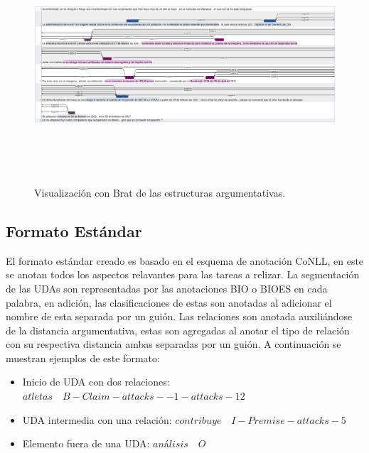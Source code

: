 \begin{figure}[h!]
	\begin{center}
		\includegraphics[scale=.4, width=450pt, height=250pt]{Graphics/persuasive_2019-03-22|inconformidad-con-la-chequera.png}
		\caption{Visualización con Brat de las estructuras argumentativas.}\label{fig:brat_persuasive_granma_letters}
	\end{center}
\end{figure}

\subsection{Formato Estándar}

El formato estándar creado es basado en el esquema de anotación CoNLL, en este se anotan todos los aspectos 
relavantes para las tareas a relizar. La segmentación de las UDAs son representadas por las anotaciones 
BIO o BIOES en cada palabra, en adición, las clasificaciones de estas son anotadas al adicionar el nombre 
de esta separada por un guión. Las relaciones son anotada auxiliándose de la distancia argumentativa, estas 
son agregadas al anotar el tipo de relación con su respectiva distancia ambas separadas por un guión. A 
continuación se muestran ejemplos de este formato:

\begin{itemize}
	\item Inicio de UDA con dos relaciones: $atletas \quad B-Claim-attacks--1-attacks-12$
	\item UDA intermedia con una relación: $contribuye \quad I-Premise-attacks-5$
	\item Elemento fuera de una UDA: $análisis \quad O$
\end{itemize}

